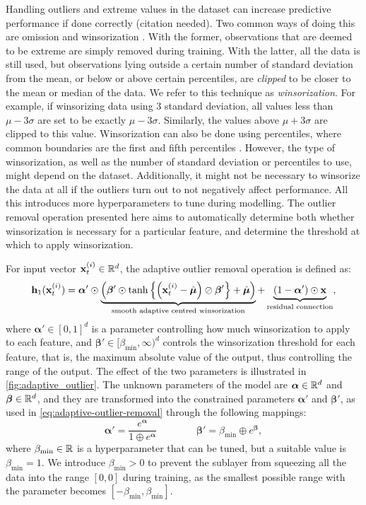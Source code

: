 \documentclass{statsmsc}
\begin{document}
{Handling outliers and extreme values in the dataset can increase predictive performance if done
correctly (citation needed). Two common ways of doing this are omission and winsorization
\citep{winsorization}. With the former, observations that are deemed to be extreme are simply
removed during training. With the latter, all the data is still used, but observations lying
outside a certain number of standard deviation from the mean, or below or above certain
percentiles, are \textit{clipped} to be closer to the mean or median of the data. We refer to this
technique as \textit{winsorization}.
For example, if winsorizing data using 3 standard deviation, all values less than
$\mu-3\sigma$ are set to be exactly $\mu-3\sigma$. Similarly, the values above
$\mu+3\sigma$ are clipped to this value. Winsorization can also be done using percentiles,
where common boundaries are the first and fifth percentiles \citep{winsorization}.
However, the type of winsorization, as well as the number of standard deviation
or percentiles to use, might depend on the dataset. Additionally, it might not
be necessary to winsorize the data at all if the outliers turn out to not
negatively affect performance. All this introduces more hyperparameters to tune
during modelling. The outlier removal operation presented here aims to automatically  determine both
whether winsorization is necessary for a particular feature, and determine the threshold at
which to apply winsorization.

For input vector $\mathbf{x}_t^{(i)} \in \mathbb{R}^d$, the adaptive outlier removal operation is defined as:
\begin{equation}\label{eq:adaptive-outlier-removal}
    \mathbf{h}_1(\mathbf{x}_t^{(i)})=\bm\alpha' \odot \underbrace{\left(\bm\beta' \odot
        \tanh\left\{\left(\mathbf{x}_t^{(i)}-\hat{\bm\mu}\right) \oslash \bm\beta'  \right\}+\hat{\bm\mu}
\right)}_{\text{smooth adaptive centred winsorization}}
    +\underbrace{\left(1-\bm\alpha' \right) \odot \mathbf{x}}_{\text{residual connection}},
\end{equation}
where
$\bm\alpha' \in [0,1]^d$ is a parameter controlling how much winsorization to apply to each feature,
and $\bm\beta' \in [\beta_{\text{min}},\infty)^d$ controls the winsorization threshold for
each feature, that is, the maximum absolute value of the output, thus controlling the range of the
output. The effect of the two parameters is illustrated in \cref{fig:adaptive_outlier}.
The unknown parameters of the model are $\bm\alpha \in \mathbb{R}^d$ and $\bm\beta \in \mathbb{R}^d$, and they
are transformed into the constrained parameters $\bm\alpha'$ and $\bm\beta'$, as used in
\cref{eq:adaptive-outlier-removal} through the following  mappings:
\begin{equation}
    \bm\alpha'=\frac{e^{\bm\alpha}}{1\oplus e^{\bm\alpha}} \qquad\qquad
    \bm\beta'=\beta_{\text{min}}\oplus e^{\bm\beta},
\end{equation}
where $\beta_{\textrm{min}} \in \mathbb{R}$ is a hyperparameter that can be tuned, but a suitable value is $\beta_{\textrm{min}}=1$. We introduce $\beta_{\textrm{min}}>0$ to prevent the sublayer from
squeezing all the data into the range $[0,0]$ during training, as the smallest possible range
with the parameter becomes $[-\beta_{\textrm{min}}, \beta_{\textrm{min}}]$.


}
\end{document}
